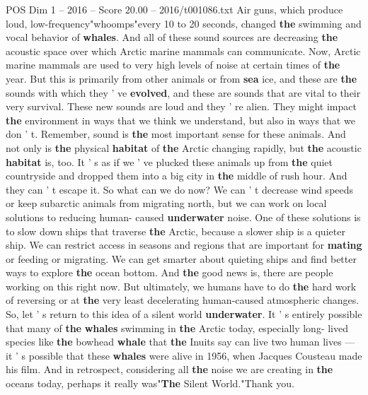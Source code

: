 \begin{textsample}{POS Dim 1 – 2016 – Score 20.00 – 2016/t001086.txt}
Air guns, which produce loud, low-frequency"whoomps"every 10 to 20 seconds, changed \textbf{the} swimming and vocal behavior of \textbf{whales}.
And all of these sound sources are decreasing \textbf{the} acoustic space over which Arctic marine mammals can communicate.
Now, Arctic marine mammals are used to very high levels of noise at certain times of \textbf{the} year.
But this is primarily from other animals or from \textbf{sea} ice, and these are \textbf{the} sounds with which they ' ve \textbf{evolved}, and these are sounds that are vital to their very survival.
These new sounds are loud and they ' re alien.
They might impact \textbf{the} environment in ways that we think we understand, but also in ways that we don ' t.
Remember, sound is \textbf{the} most important sense for these animals.
And not only is \textbf{the} physical \textbf{habitat} of \textbf{the} Arctic changing rapidly, but \textbf{the} acoustic \textbf{habitat} is, too.
It ' s as if we ' ve plucked these animals up from \textbf{the} quiet countryside and dropped them into a big city in \textbf{the} middle of rush hour.
And they can ' t escape it.
So what can we do now?
We can ' t decrease wind speeds or keep subarctic animals from migrating north, but we can work on local solutions to reducing human- caused \textbf{underwater} noise.
One of these solutions is to slow down ships that traverse \textbf{the} Arctic, because a slower ship is a quieter ship.
We can restrict access in seasons and regions that are important for \textbf{mating} or feeding or migrating.
We can get smarter about quieting ships and find better ways to explore \textbf{the} ocean bottom.
And \textbf{the} good news is, there are people working on this right now.
But ultimately, we humans have to do \textbf{the} hard work of reversing or at \textbf{the} very least decelerating human-caused atmospheric changes.
So, let ' s return to this idea of a silent world \textbf{underwater}.
It ' s entirely possible that many of \textbf{the} \textbf{whales} swimming in \textbf{the} Arctic today, especially long- lived species like \textbf{the} bowhead \textbf{whale} that \textbf{the} Inuits say can live two human lives — it ' s possible that these \textbf{whales} were alive in 1956, when Jacques Cousteau made his film.
And in retrospect, considering all \textbf{the} noise we are creating in \textbf{the} oceans today, perhaps it really was"\textbf{The} Silent World."Thank you.

\end{textsample}
